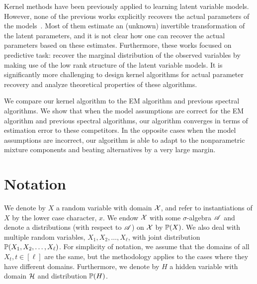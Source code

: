 \documentclass{article}
\begin{document}
 Kernel methods have  been previously applied to learning latent variable models. However, none of the previous works explicitly recovers the actual parameters of the models~\cite{SonParXin11, SonDai13, SgoJanPetSch13}. Most of them estimate an (unknown) invertible  transformation of the latent parameters, and it is not clear how one can recover the actual parameters based on these estimates. Furthermore, these works focused on predictive task: recover the marginal distribution of the observed variables by making use of the low rank structure of the latent variable models. It is significantly more challenging to design kernel algorithms for actual parameter recovery and analyze theoretical properties of these algorithms.

We compare our kernel algorithm to the EM algorithm and previous spectral algorithms. We show that when the model assumptions are correct for the EM algorithm and previous spectral algorithms, our algorithm converges in terms of estimation error to these competitors. In the opposite cases when the model assumptions are incorrect, our algorithm is able to adapt to the nonparametric mixture components and beating alternatives by a very large margin.

\section{Notation}

We  denote by $X$ a random variable with domain $\mathcal{X}$,
and refer to instantiations of $X$ by the lower case character, $x$.
We endow $\mathcal{X}$ with some $\sigma$-algebra $\mathscr{A}$ and denote a distributions (with respect to $\mathscr{A}$) on $\mathcal{X}$ by $\mathbb{P}(X)$. We  also deal with multiple random variables, $X_1, X_2, \ldots, X_{\ell}$, with joint distribution $\mathbb{P}(X_1,X_2,\ldots,X_{\ell})$. For simplicity of notation, we assume that the domains of all $X_t, t \in [\ell]$ are the same, but the methodology applies to the cases where they have different domains. Furthermore, we denote by $H$ a hidden variable with domain $\mathcal{H}$ and distribution $\mathbb{P}(H)$.
\end{document}
